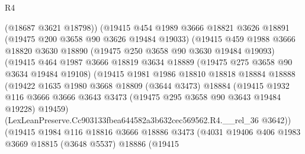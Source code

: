 \begin{lexlean}{R4}
\begin{coremodule}
                        (@18687 @3621 @18798))
                      (@19415
                        @454
                        @1989
                        @3666
                        @18821
                        @3626
                        @18891
                        (@19475 @200 @3658 @90 @3626 @19484 @19033)
                        (@19415
                          @459
                          @1988
                          @3666
                          @18820
                          @3630
                          @18890
                          (@19475 @250 @3658 @90 @3630 @19484 @19093)
                          (@19415
                            @464
                            @1987
                            @3666
                            @18819
                            @3634
                            @18889
                            (@19475 @275 @3658 @90 @3634 @19484 @19108)
                            (@19415
                              @1981
                              @1986
                              @18810
                              @18818
                              @18884
                              @18888
                              (@19422
                                @1635
                                @1980
                                @3668
                                @18809
                                (@3644 @3473)
                                @18884
                                (@19415
                                  @1932
                                  @116
                                  @3666
                                  @3666
                                  @3643
                                  @3473
                                  (@19475 @295 @3658 @90 @3643 @19484 @19228)
                                  @19459)
                                (LexLeanPreserve.Cc903133fbea644582a3b632cec569562.R4.__rel_36
                                  @3642))
                              (@19415
                                @1984
                                @116
                                @18816
                                @3666
                                @18886
                                @3473
                                (@4031
                                  @19406
                                  @406
                                  @1983
                                  @3669
                                  @18815
                                  (@3648 @5537)
                                  @18886
                                  (@19415

\end{coremodule}
\end{lexlean}
